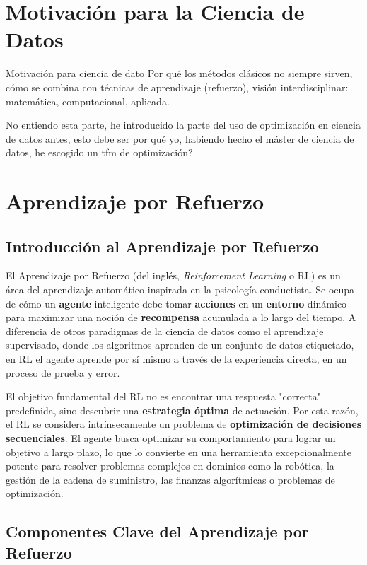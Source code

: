 \documentclass[12pt,a4paper]{book}
\begin{document}
\section{Motivación para la Ciencia de Datos}

\color{red}
Motivación para ciencia de dato Por qué los métodos clásicos no siempre sirven, cómo se combina con técnicas de aprendizaje (refuerzo), visión interdisciplinar: matemática, computacional, aplicada.

No entiendo esta parte, he introducido la parte del uso de optimización en ciencia de datos antes, esto debe ser por qué yo, habiendo hecho el máster de ciencia de datos, he escogido un tfm de optimización?

\color{black}

\section{Aprendizaje por Refuerzo}

\subsection{Introducción al Aprendizaje por Refuerzo}

El Aprendizaje por Refuerzo (del inglés, \textit{Reinforcement Learning} o RL) es un área del aprendizaje automático inspirada en la psicología conductista. Se ocupa de cómo un \textbf{agente} inteligente debe tomar \textbf{acciones} en un \textbf{entorno} dinámico para maximizar una noción de \textbf{recompensa} acumulada a lo largo del tiempo.
A diferencia de otros paradigmas de la ciencia de datos como el aprendizaje supervisado, donde los algoritmos aprenden de un conjunto de datos etiquetado, en RL el agente aprende por sí mismo a través de la experiencia directa, en un proceso de prueba y error.

El objetivo fundamental del RL no es encontrar una respuesta "correcta" predefinida, sino descubrir una \textbf{estrategia óptima} de actuación. Por esta razón, el RL se considera intrínsecamente un problema de \textbf{optimización de decisiones secuenciales}. El agente busca optimizar su comportamiento para lograr un objetivo a largo plazo, lo que lo convierte en una herramienta excepcionalmente potente para resolver problemas complejos en dominios como la robótica, la gestión de la cadena de suministro, las finanzas algorítmicas o problemas de optimización.

\subsection{Componentes Clave del Aprendizaje por Refuerzo}
\end{document}

